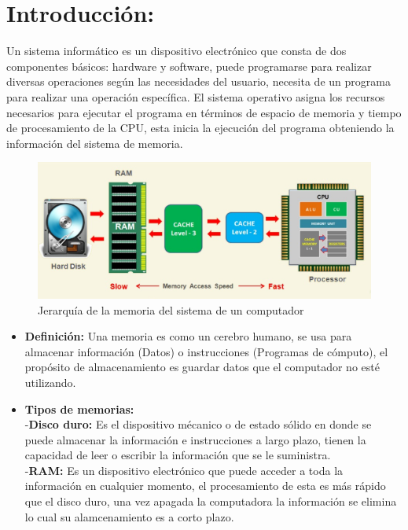 \documentclass{article}
\begin{document}
\section*{Introducción:}
\begin{flushleft}
    Un sistema informático es un dispositivo electrónico que consta de dos componentes básicos: hardware y software, puede programarse para realizar diversas operaciones según las necesidades del usuario, necesita de un programa para realizar una operación específica. El sistema operativo asigna los recursos necesarios para ejecutar el programa en términos de espacio de memoria y tiempo de procesamiento de la CPU, esta inicia la ejecución del programa obteniendo la información del sistema de memoria.
    \begin{figure}[htp]
        \includegraphics[width=14cm]{Images/Sistema de memoria.PNG}
        \caption{Jerarquía de la memoria del sistema de un computador}
        \label{hola:out}
    \end{figure}
    \begin{itemize}
        \item \textbf{Definición:} Una memoria es como un cerebro humano, se usa para almacenar información (Datos) o instrucciones (Programas de cómputo), el propósito de almacenamiento es guardar datos que el computador no esté utilizando.
        \item \textbf{Tipos de memorias:}\\
        -\textbf{Disco duro:} Es el dispositivo mécanico o de estado sólido en donde se puede almacenar la información e instrucciones a largo plazo, tienen la capacidad de leer o escribir la información que se le suministra.\\
        -\textbf{RAM:} Es un dispositivo electrónico que puede acceder a toda la información en cualquier momento, el procesamiento de esta es más rápido que el disco duro, una vez apagada la computadora la información se elimina lo cual su alamcenamiento es a corto plazo.\\

\end{itemize}
\end{flushleft}
\end{document}
